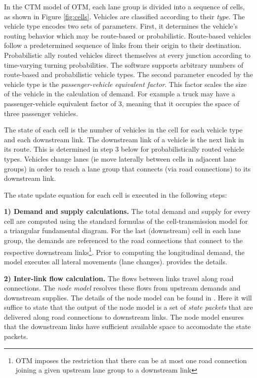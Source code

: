 In the CTM model of OTM, each lane group is divided into a sequence of cells, as shown in Figure \ref{fig:cells}. Vehicles are classified according to their \textit{type}. The vehicle type encodes two sets of parameters. First, it determines the vehicle's routing behavior which may be route-based or probabilistic. Route-based vehicles follow a predetermined sequence of links from their origin to their destination. Probabilistic ally routed vehicles direct themselves at every junction according to time-varying turning probabilities. The software supports arbitrary numbers of route-based and probabilistic vehicle types. The second parameter encoded by the vehicle type is the \textit{passenger-vehicle equivalent factor}. This factor scales the size of the vehicle in the calculation of demand. For example a truck may have a passenger-vehicle equivalent factor of 3, meaning that it occupies the space of three passenger vehicles.

The state of each cell is the number of vehicles in the cell for each vehicle type and each downstream link. The downstream link of a vehicle is the next link in its route. This is determined in step 3 below for probabilistically routed vehicle types. Vehicles change lanes (ie move laterally between cells in adjacent lane groups) in order to reach a lane group that connects (via road connections) to its downstream link. 

The state update equation for each cell is executed in the following steps:

\vspace{1em} \noindent \textbf{1) Demand and supply calculations.} The total demand and supply for every cell are computed using the standard formulas of the cell-transmission model for a triangular fundamental diagram. For the last (downstream) cell in each lane group, the demands are referenced to the road connections that connect to the respective downstream links\footnote{OTM imposes the restriction that there can be at most one road connection joining a given upstream lane group to a downstream link}. Prior to computing the longitudinal demand, the model executes all lateral movements (lane changes). \cite{Gomes2019OpenTM} provides the details. 

\vspace{1em}\noindent \textbf{2) Inter-link flow calculation.} The flows between links travel along road connections. The \textit{node model} resolves these flows from upstream demands and downstream supplies. The details of the node model can be found in \cite{Gomes2019OpenTM}. Here it will suffice to state that the output of the node model is a set of \textit{state packets} that are delivered along road connections to downstream links. The node model ensures that the downstream links have sufficient available space to accomodate the state packets.  

